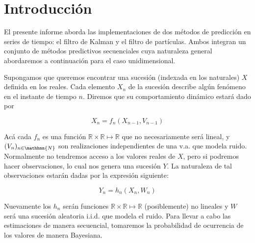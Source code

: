 \documentclass[letterpaper,11pt,oneside]{article}
\begin{document}
	





\inserttitle


\section{Introducción}
El presente informe aborda las implementaciones de dos métodos de predicción en series de tiempo: el filtro de Kalman y el filtro de partículas. Ambos integran un conjunto de métodos predictivos secuenciales cuya naturaleza general abordaremos a continuación para el caso unidimensional.

\newp Supongamos que queremos encontrar una sucesión (indexada en los naturales) $X$ definida en los reales. Cada elemento $X_n$ de la sucesión describe algún fenómeno en el instante de tiempo $n$. Diremos que su comportamiento dinámico estará dado por

$$ X_n = f_n(X_{n-1},V_{n-1})$$

Acá cada $f_n$ es una función $\mathbb{R}\times\mathbb{R}\mapsto\mathbb{R}$ que no necesariamente será lineal, y $(V_n)_{n\in\mathhnn{N}}$ son realizaciones independientes de una v.a. que modela ruido. Normalmente no tendremos acceso a los valores reales de $X$, pero si podremos hacer observaciones, lo cual nos genera una sucesión $Y$. La naturaleza de tal observaciones estarán dadas por la expresión siguiente:

$$ Y_n = h_n(X_n,W_n)$$

Nuevamente los $h_n$ serán funciones $\mathbb{R}\times\mathbb{R}\mapsto\mathbb{R}$ (posiblemente) no lineales y $W$ será una sucesión aleatoria i.i.d. que modela el ruido. Para llevar a cabo las estimaciones de manera secuencial, tomaremos la probabilidad de ocurrencia de los valores de manera Bayesiana.  %

\end{document}
